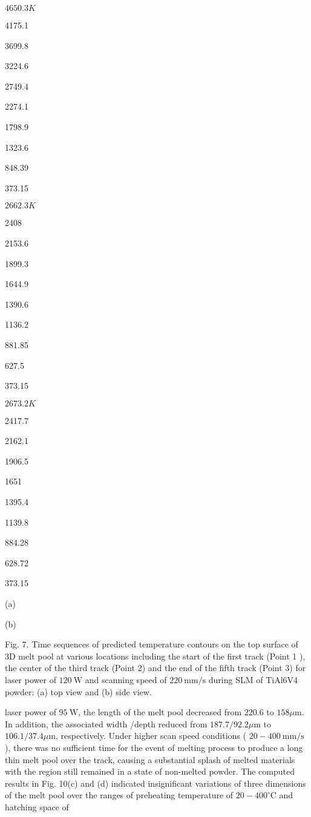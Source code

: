 \documentclass[10pt]{article}
\begin{document}
$4650.3 K$

4175.1

3699.8

3224.6

2749.4

2274.1

1798.9

1323.6

848.39

373.15

$2662.3 K$

2408

2153.6

1899.3

1644.9

1390.6

1136.2

881.85

627.5

373.15

$2673.2 K$

2417.7

2162.1

1906.5

1651

1395.4

1139.8

884.28

628.72

373.15

(a)

(b)

Fig. 7. Time sequences of predicted temperature contours on the top surface of 3D melt pool at various locations including the start of the first track (Point 1 ), the center of the third track (Point 2) and the end of the fifth track (Point 3) for laser power of $120 \mathrm{~W}$ and scanning speed of $220 \mathrm{~mm} / \mathrm{s}$ during SLM of TiAl6V4 powder: (a) top view and (b) side view.

laser power of $95 \mathrm{~W}$, the length of the melt pool decreased from 220.6 to $158 \mu \mathrm{m}$. In addition, the associated width /depth reduced from $187.7 / 92.2 \mu \mathrm{m}$ to $106.1 / 37.4 \mu \mathrm{m}$, respectively. Under higher scan speed conditions ( $20-400 \mathrm{~mm} / \mathrm{s}$ ), there was no sufficient time for the event of melting process to produce a long thin melt pool over the track, causing a substantial splash of melted materials with the region still remained in a state of non-melted powder. The computed results in Fig. 10(c) and (d) indicated insignificant variations of three dimensions of the melt pool over the ranges of preheating temperature of $20-400^{\circ} \mathrm{C}$ and hatching space of
\end{document}
